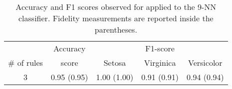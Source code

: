 
\begin{table}
	\caption{Accuracy and F1 scores observed for \cart{} applied to the 9-NN classifier. Fidelity measurements are reported inside the parentheses.}
	\label{tab:cart}
	\begin{tabular}{c|c|ccc}
		\toprule
		& Accuracy & \multicolumn{3}{c}{F1-score}\\
 		\# of rules & score & Setosa & Virginica & Versicolor \\
		\midrule
		3 & 0.95 (0.95) & 1.00 (1.00) & 0.91 (0.91) & 0.94 (0.94) \\
		\bottomrule
	\end{tabular}
\end{table}
